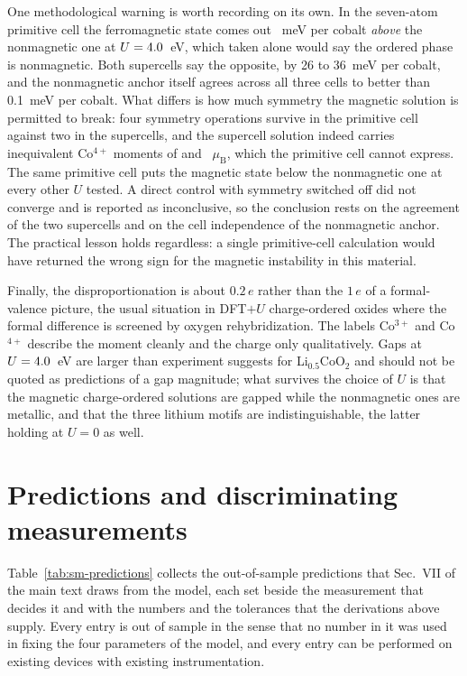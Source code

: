 \documentclass[reprint,twocolumn,prb,amsmath,amssymb,superscriptaddress,floatfix]{revtex4-2}
\newcommand{\muBs}{\mu_{\mathrm{B}}}
\begin{document}
One methodological warning is worth recording on its own. In the seven-atom primitive cell the
ferromagnetic state comes out \primSign~meV per cobalt \emph{above} the nonmagnetic one at
$U=4.0$~eV, which taken alone would say the ordered phase is nonmagnetic. Both supercells say
the opposite, by 26 to 36~meV per cobalt, and the nonmagnetic anchor itself agrees across all
three cells to better than 0.1~meV per cobalt. What differs is how much symmetry the magnetic
solution is permitted to break: four symmetry operations survive in the primitive cell against
two in the supercells, and the supercell solution indeed carries inequivalent Co$^{4+}$ moments
of \momentFMa{} and \momentFMb~$\muBs$, which the primitive cell cannot express. The same primitive cell
puts the magnetic state below the nonmagnetic one at every other $U$ tested. A direct control
with symmetry switched off did not converge and is reported as inconclusive, so the conclusion
rests on the agreement of the two supercells and on the cell independence of the nonmagnetic
anchor. The practical lesson holds regardless: a single primitive-cell calculation would have
returned the wrong sign for the magnetic instability in this material.

Finally, the disproportionation is about $0.2\,e$ rather than the $1\,e$ of a formal-valence
picture, the usual situation in DFT$+U$ charge-ordered oxides where the formal difference is
screened by oxygen rehybridization. The labels Co$^{3+}$ and Co$^{4+}$ describe the moment
cleanly and the charge only qualitatively. Gaps at $U=4.0$~eV are larger than experiment
suggests for Li$_{0.5}$CoO$_2$ and should not be quoted as predictions of a gap magnitude; what survives the choice of $U$ is that the magnetic charge-ordered solutions are gapped while the
nonmagnetic ones are metallic, and that the three lithium motifs are indistinguishable, the
latter holding at $U=0$ as well.

\section{Predictions and discriminating measurements}
\label{sec:sm-predictions}

Table~\ref{tab:sm-predictions} collects the out-of-sample predictions that Sec.~VII of the main
text draws from the model, each set beside the measurement that decides it and with the numbers
and the tolerances that the derivations above supply. Every entry is out of sample in the sense
that no number in it was used in fixing the four parameters of the model, and every entry can be
performed on existing devices with existing instrumentation.
\end{document}
